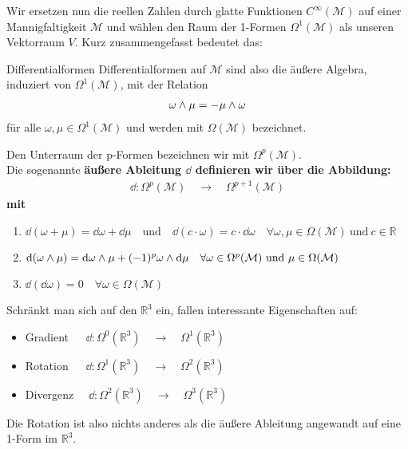 Wir ersetzen nun die reellen Zahlen durch glatte Funktionen $C^{\infty}(\mathcal{M})$ auf einer Mannigfaltigkeit $\mathcal{M}$ und wählen den Raum der 1-Formen $\Omega^1(\mathcal{M})$ als unseren Vektorraum $V$. Kurz zusammengefasst bedeutet das:
\begin{mybox}{Differentialformen}
Differentialformen auf $\mathcal{M}$ sind also die äußere Algebra, induziert von $\Omega^1(\mathcal{M})$, mit der Relation 
\begin{align*}
\omega \wedge \mu = -\mu \wedge \omega 
\end{align*} 
für alle $\omega, \mu \in \Omega^1(\mathcal{M})$ und werden mit $\Omega(\mathcal{M})$ bezeichnet.
\end{mybox}
Den Unterraum der p-Formen bezeichnen wir mit $\Omega^p(\mathcal{M})$. \\
Die sogenannte \bfseries äußere Ableitung $\dd$ \normalfont definieren wir über die Abbildung:
\begin{align*}
\dd: \Omega^p(\mathcal{M}) \quad \rightarrow \quad  \Omega^{p+1}(\mathcal{M})
\end{align*}
\centering mit
\begin{enumerate}
\item $\dd(\omega + \mu) = \dd\omega + \dd\mu \quad \text{und} \quad \dd(c\cdot\omega) = c\cdot\dd\omega \quad \forall \omega, \mu \in \Omega(\mathcal{M}) \ \text{und} \ c \in \mathbb{R} $
\item $\dd(\omega \wedge \mu) = \dd \omega \wedge \mu + (-1)^p \omega \wedge \dd\mu \quad \forall \omega \in \Omega^p(\mathcal{M}) \ \text{und} \ \mu \in \Omega(\mathcal{M})$
\item $\dd(\dd \omega) = 0 \quad \forall \omega \in \Omega(\mathcal{M}) $
\end{enumerate}
\flushleft
Schränkt man sich auf den $\mathbb{R}^3$ ein, fallen interessante Eigenschaften auf:
\begin{itemize}
\bfseries
\item Gradient $\quad \ \dd: \Omega^0(\mathbb{R}^3) \quad \rightarrow \quad  \Omega^1(\mathbb{R}^3)$
\item Rotation $\quad \ \dd: \Omega^1(\mathbb{R}^3) \quad \rightarrow \quad  \Omega^2(\mathbb{R}^3)$
\item Divergenz $\quad \dd: \Omega^2(\mathbb{R}^3) \quad \rightarrow \quad  \Omega^3(\mathbb{R}^3)$
\end{itemize}
\normalfont
Die Rotation ist also nichts anderes als die äußere Ableitung angewandt auf eine 1-Form im $\mathbb{R}^3.$
